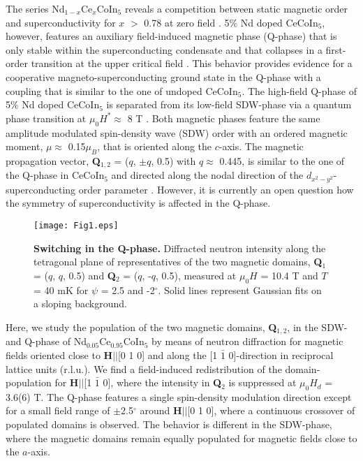 \documentclass[article,twocolumn,showpacs,preprintnumbers,amsmath,amssymb, superscriptaddress]{revtex4-1}
\begin{document}
The series Nd$_{1-x}$Ce$_x$CoIn$_5$ reveals a competition between static magnetic order and superconductivity for $x$ $>$ 0.78 at zero field \cite{Hu2008}. 5\% Nd doped CeCoIn$_5$, however, features an auxiliary field-induced magnetic phase (Q-phase) that is only stable within the superconducting condensate and that collapses in a first-order transition at the upper critical field \cite{Mazzone2017}. This behavior provides evidence for a cooperative magneto-superconducting ground state in the Q-phase with a coupling that is similar to the one of undoped CeCoIn$_5$.  The high-field Q-phase of 5\% Nd doped CeCoIn$_5$ is separated from its low-field SDW-phase via a quantum phase transition at $\mu_0H^*\approx$ 8 T \cite{Mazzone2017}. Both magnetic phases feature the same amplitude modulated spin-density wave (SDW) order with an ordered magnetic moment, $\mu\approx$ 0.15$\mu_B$, that is oriented along the $c$-axis. The magnetic propagation vector, \textbf{Q}$_{1,2}$ = ($q$, $\pm q$, 0.5) with $q\approx$  0.445, is similar to the one of the Q-phase in CeCoIn$_5$ and directed along the nodal direction of the $d_{x^2-y^2}$-superconducting order parameter \cite{Mazzone2017}. However, it is currently an open question how the symmetry of superconductivity is affected in the Q-phase.
\begin{figure*}[tbh]
\texttt{[image: Fig1.eps]}
\caption{\textbf{Switching in the Q-phase.} Diffracted neutron intensity along the tetragonal plane of representatives of the two magnetic domains, \textbf{Q$_1$} = ($q$, $q$, 0.5) and \textbf{Q$_2$} = ($q$, -$q$, 0.5), measured at $\mu_0H$ = 10.4 T and $T$ = 40 mK for $\psi$ = 2.5 and -2$^\circ$. Solid lines represent Gaussian fits on a sloping background.}
\label{fig1}
\end{figure*}

Here, we study the population of the two magnetic domains, \textbf{Q}$_{1,2}$, in the SDW- and Q-phase of Nd$_{0.05}$Ce$_{0.95}$CoIn$_5$ by means of neutron diffraction for magnetic fields oriented close to \textbf{H}$||$[0 1 0] and along the [1 $\bar{1}$ 0]-direction in reciprocal lattice units (r.l.u.). We find a field-induced redistribution of the domain-population for \textbf{H}$||$[1 $\bar{1}$ 0], where the intensity in \textbf{Q}$_{2}$ is suppressed at $\mu_0H_d$ =  3.6(6) T. The Q-phase features a single spin-density modulation direction except for a small field range of $\pm$2.5$^\circ$ around \textbf{H}$||$[0 1 0], where a continuous crossover of populated domains is observed. The behavior is different in the SDW-phase, where the magnetic domains remain equally populated for magnetic fields close to the $a$-axis. 
\end{document}
